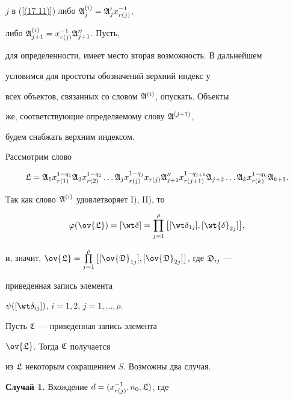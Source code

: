 $j$ в (\ref{(17.11)}) либо $\frak A^{(i)}_j=\frak A'_jx^{-1}_{r(j)}$,


либо $\frak A^{(i)}_{j+1}=x^{-1}_{r(j)}\frak A''_{j+1}$. Пусть,


для определенности, имеет место вторая возможность. В дальнейшем 


условимся для простоты обозначений верхний индекс у


всех объектов, связанных со словом $\frak A^{(i)}$, опускать. Объекты


же, соответствующие определяемому слову $\frak A^{(j+1)}$,


будем снабжать верхним индексом.





Рассмотрим слово


$$


\frak L=\frak A_1 x^{1-q_1}_{r(1)}\frak A_2 x^{1-q_2}_{r(2)} \dotsc


\frak A_{j}x^{1-q_j}_{r(j)}x_{r(j)}\frak A''_{j+1}x^{1-q_{j+1}}_{r(j+1)}


\frak A_{j+2}\dotsc\frak A_k x^{1-q_k}_{r(k)}\frak A_{k+1}.


$$


Так как слово $\frak A^{(i)}$ удовлетворяет I), II), то


\begin{equation}


\varphi(\ov{\frak L})=[\wt \delta]=\prod_{j=1}^\rho\big[


[\wt \delta_{1j}],[\wt {\delta}_{{2j}}]\big],


\label{103}


\end{equation}


и, значит, $\ov{\frak L}=\PL_{j=1}^\rho\big[[\ov{\frak D}_{1j}],


[\ov{\frak D}_{2j}]\big]$, где $\frak D_{ij}$ ---


приведенная запись элемента


$\psi([\wt \delta_{ij}])$, $i=1,2$, $j=1,\dotsc,\rho$.


Пусть $\frak C$ --- приведенная запись элемента


$\ov{\frak L}$. Тогда $\frak C$ получается


из $\frak L$ некоторым сокращением $S$. Возможны два случая.


\medskip





{\bf Случай 1.} Вхождение $d=(x^{-1}_{r(j)},n_0,\frak L)$, где


